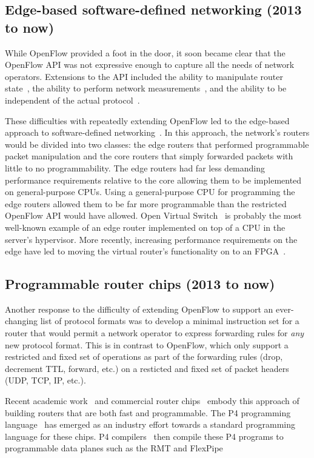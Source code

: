 \subsection{Edge-based software-defined networking (2013 to now)}
While OpenFlow provided a foot in the door, it soon became clear that the
OpenFlow API was not expressive enough to capture all the needs of network
operators. Extensions to the API included the ability to manipulate router
state~\cite{fast}, the ability to perform network
measurements~\cite{opensketch}, and the ability to be independent of the actual
protocol~\cite{pof}.

These difficulties with repeatedly extending OpenFlow led to the edge-based
approach to software-defined networking~\cite{fabric, nsx, openvswitch}. In
this approach, the network's routers would be divided into two classes: the
edge routers that performed programmable packet manipulation and the core
routers that simply forwarded packets with little to no programmability. The
edge routers had far less demanding performance requirements relative to the
core allowing them to be implemented on general-purpose CPUs. Using a
general-purpose CPU for programming the edge routers allowed them to be far
more programmable than the restricted OpenFlow API would have allowed. Open
Virtual Switch~\cite{ovs} is probably the most well-known example of an edge
router implemented on top of a CPU in the server's hypervisor. More recently,
increasing performance requirements on the edge have led to moving the virtual
router's functionality on to an FPGA~\cite{daniel_firestone_nsdi}. 


\subsection{Programmable router chips (2013 to now)}
Another response to the difficulty of extending OpenFlow to support an
ever-changing list of protocol formats was to develop a minimal instruction set
for a router that would permit a network operator to express forwarding rules
for {\em any} new protocol format. This is in contrast to OpenFlow, which only
support a restricted and fixed set of operations as part of the forwarding
rules (drop, decrement TTL, forward, etc.) on a resticted and fixed set of
packet headers (UDP, TCP, IP, etc.).

Recent academic work~\cite{rmt} and commercial router chips~\cite{tofino,
flexpipe, xpliant} embody this approach of building routers that are
both fast and programmable. The P4 programming language~\cite{p4} has emerged
as an industry effort towards a standard programming language for these chips.
P4 compilers~\cite{lavanya_compiler, p4c} then compile these P4 programs to
programmable data planes such as the RMT and FlexPipe~\cite{flexpipe}


